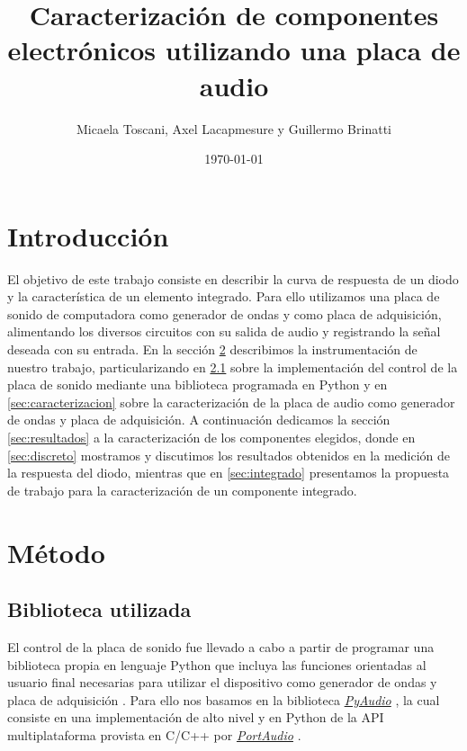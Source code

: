 \documentclass[a4paper,11pt]{article}
\title{Caracterización de componentes electrónicos utilizando una placa de audio}
\date{\today}
\author{Micaela Toscani, Axel Lacapmesure y Guillermo Brinatti}
\begin{document}
\maketitle

\section{Introducción}

El objetivo de este trabajo consiste en describir la curva de respuesta de un diodo y la característica de un elemento integrado. Para ello utilizamos una placa de sonido de computadora como generador de ondas y como placa de adquisición, alimentando los diversos circuitos con su salida de audio y registrando la señal deseada con su entrada. En la sección \ref{sec:metodo} describimos la instrumentación de nuestro trabajo, particularizando en \ref{sec:biblioteca} sobre la implementación del control de la placa de sonido mediante una biblioteca programada en Python y en \ref{sec:caracterizacion} sobre la caracterización de la placa de audio como generador de ondas y placa de adquisición. A continuación dedicamos la sección \ref{sec:resultados} a la caracterización de los componentes elegidos, donde en \ref{sec:discreto} mostramos y discutimos los resultados obtenidos en la medición de la respuesta del diodo, mientras que en \ref{sec:integrado} presentamos la propuesta de trabajo para la caracterización de un componente integrado.

\section{Método}
\label{sec:metodo}

	\subsection{Biblioteca utilizada}
	\label{sec:biblioteca}
	
	El control de la placa de sonido fue llevado a cabo a partir de programar una biblioteca propia en lenguaje Python que incluya las funciones orientadas al usuario final necesarias para utilizar el dispositivo como generador de ondas y placa de adquisición \cite{repo}. Para ello nos basamos en la biblioteca \emph{\href{https://people.csail.mit.edu/hubert/pyaudio/}{PyAudio}} \cite{pyaudio}, la cual consiste en una implementación de alto nivel y en Python de la API multiplataforma provista en C/C++ por \emph{\href{http://www.portaudio.com/}{PortAudio}} \cite{portaudio}.
	
\end{document}
